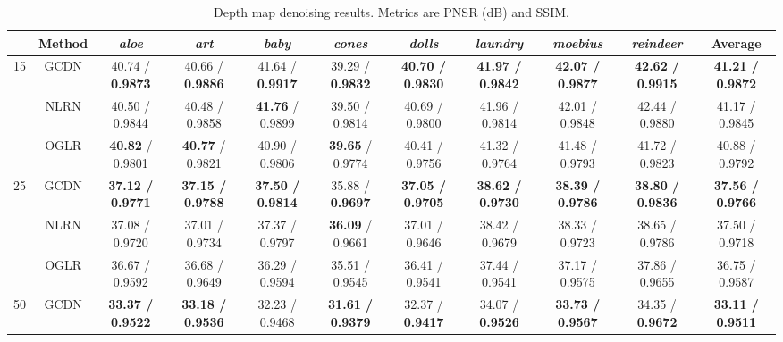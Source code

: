 \documentclass[journal]{IEEEtran}
\begin{document}
\begin{table*}[t]
\setlength{\tabcolsep}{4pt} \renewcommand{\arraystretch}{1} \centering
\caption{Depth map denoising results. Metrics are PNSR (dB) and SSIM.}
\begin{tabular}{ccccccccccc}
\hline
      & Method   & \textit{aloe}           & \textit{art}            & \textit{baby}           & \textit{cones}          & \textit{dolls}          & \textit{laundry}        & \textit{moebius}        & \textit{reindeer}               & Average                 \\ \hline
\multirow{3}{*}{15} & GCDN & 40.74 / \textbf{0.9873}          & 40.66 / \textbf{0.9886}          & 41.64 / \textbf{0.9917}          & 39.29 / \textbf{0.9832}          & \textbf{40.70 / 0.9830} & \textbf{41.97 / 0.9842} & \textbf{42.07 / 0.9877}   & \textbf{42.62 / 0.9915}           & \textbf{41.21 / 0.9872} \\ 
                    & NLRN     & 40.50 / 0.9844          & 40.48 / 0.9858          & \textbf{41.76} / 0.9899 & 39.50 / 0.9814          & 40.69 / 0.9800          & 41.96 / 0.9814          & 42.01 / 0.9848          & 42.44 / 0.9880           & 41.17 / 0.9845          \\
                    & OGLR     & \textbf{40.82} / 0.9801 & \textbf{40.77} / 0.9821 & 40.90 / 0.9806          & \textbf{39.65} / 0.9774 & 40.41 / 0.9756          & 41.32 / 0.9764          & 41.48 / 0.9793          & 41.72 / 0.9823                   & 40.88 / 0.9792          \\ \hline
\multirow{3}{*}{25} & GCDN & \textbf{37.12 / 0.9771} & \textbf{37.15 / 0.9788} & \textbf{37.50 / 0.9814} & 35.88 / \textbf{0.9697}          & \textbf{37.05 / 0.9705} & \textbf{38.62 / 0.9730} & \textbf{38.39 / 0.9786} & \textbf{38.80 / 0.9836}          & \textbf{37.56 / 0.9766} \\ 
                    & NLRN     & 37.08 / 0.9720          & 37.01 / 0.9734          & 37.37 / 0.9797          & \textbf{36.09} / 0.9661 & 37.01 / 0.9646          & 38.42 / 0.9679          & 38.33 / 0.9723          & 38.65 / 0.9786         & 37.50 / 0.9718          \\ 
                    & OGLR     & 36.67 / 0.9592          & 36.68 / 0.9649          & 36.29 / 0.9594          & 35.51 / 0.9545          & 36.41 / 0.9541          & 37.44 / 0.9541          & 37.17 / 0.9575          & 37.86 / 0.9655                & 36.75 / 0.9587          \\ \hline
\multirow{3}{*}{50} & GCDN & \textbf{33.37 / 0.9522} & \textbf{33.18 / 0.9536} & 32.23 / 0.9468          & \textbf{31.61 / 0.9379} & 32.37 / \textbf{0.9417}          & 34.07 / \textbf{0.9526}          & \textbf{33.73 / 0.9567} & 34.35 / \textbf{0.9672}                   & \textbf{33.11 / 0.9511} \\  

\end{tabular}
\end{table*}
\end{document}
